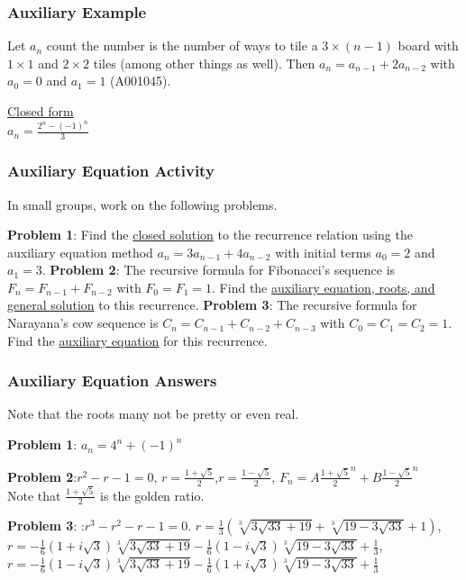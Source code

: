 \documentclass{beamer}
\begin{document}
\frame
{
  \frametitle{Auxiliary Example}

Let $a_n$ count the number is the number of ways to tile a $3 \times (n-1)$ board with $1 \times 1$ and $ 2\times 2$ tiles (among other things as well).  Then $a_n = a_{n-1} + 2a_{n-2}$ with $a_0 = 0$ and $a_1 = 1$  (A001045). \vfill


\pause \underline{Closed form}\\$a_n=\frac{2^n - (-1)^n}{3}$

}

\frame
{
  \frametitle{Auxiliary Equation Activity}

In small groups, work on the following problems.\vfill

{\bf Problem 1}: Find the \underline{closed solution} to the recurrence relation using the auxiliary equation method $a_n=3a_{n-1}+4a_{n-2}$
with initial terms $a_0=2$ and $a_1=3$.\vfill
{\bf Problem 2}: The recursive formula for Fibonacci's sequence is $F_n=F_{n-1}+F_{n-2}$ with $F_0=F_1=1$.  Find the \underline{auxiliary equation, roots, and general solution} to this recurrence.\vfill
{\bf Problem 3}: The recursive formula for Narayana's cow sequence is $C_n=C_{n-1}+C_{n-2}+C_{n-3}$ with $C_0=C_1=C_2=1$.  Find the \underline{auxiliary equation} for this recurrence.\vfill

}

\frame
{
  \frametitle{Auxiliary Equation Answers}

Note that the roots many not be pretty or even real.\vfill

{\bf Problem 1}: $a_n=4^n+(-1)^n$ \vfill

{\bf Problem 2}:$r^2-r-1=0$, $r=\frac{1+\sqrt{5}}{2}$,$r=\frac{1-\sqrt{5}}{2}$, $F_n=A\frac{1+\sqrt{5}}{2}^n+B\frac{1-\sqrt{5}}{2}^n$\\
Note that $\frac{1+\sqrt{5}}{2}$ is the golden ratio.\vfill


{\bf Problem 3}: :$r^3-r^2-r-1=0$. $r=\frac{1}{3}\left(\sqrt[3]{3 \sqrt{33}+19}+\sqrt[3]{19-3 \sqrt{33}}+1\right)$, $r=-\frac{1}{6} \left(1+i \sqrt{3}\right) \sqrt[3]{3 \sqrt{33}+19}-\frac{1}{6} \left(1-i \sqrt{3}\right) \sqrt[3]{19-3 \sqrt{33}}+\frac{1}{3}$, $r=-\frac{1}{6} \left(1-i \sqrt{3}\right) \sqrt[3]{3 \sqrt{33}+19}-\frac{1}{6} \left(1+i \sqrt{3}\right) \sqrt[3]{19-3 \sqrt{33}}+\frac{1}{3}$\vfill



}
\end{document}
